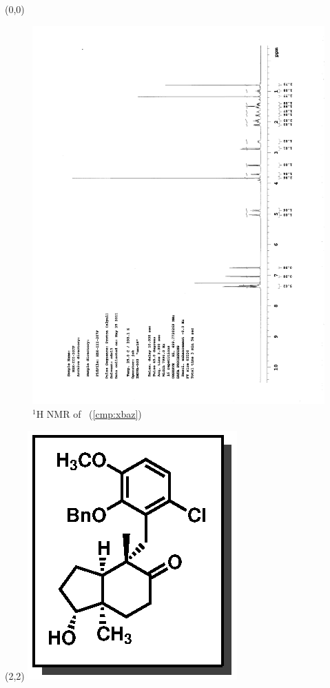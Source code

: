 \begin{textblock}{20}(0,0)
\begin{figure}[htb]
\caption{$^1$H NMR of \CMPxbaz\ (\ref{cmp:xbaz})}
\includegraphics[scale=0.75, trim = 0mm 0mm 0mm 5mm,
clip]{chp_singlecarbon/images/nmr/xbazH}
\vspace{-100pt}
\end{figure}
\end{textblock}
\begin{textblock}{1}(2,2)
\includegraphics[scale=0.8, angle=90]{chp_singlecarbon/images/xbaz}
\end{textblock}
